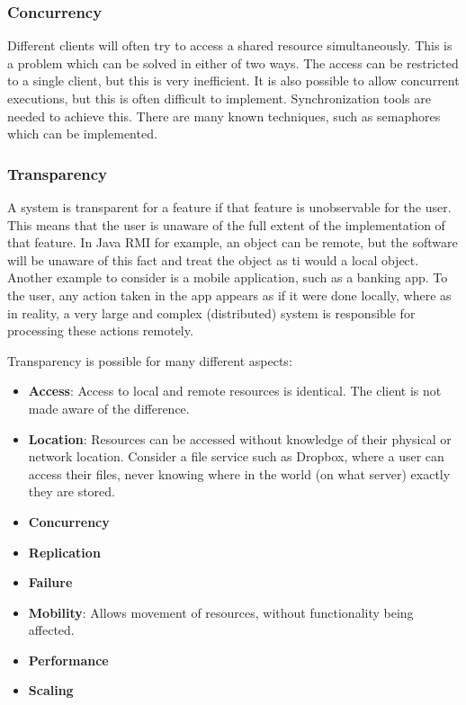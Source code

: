 \documentclass[a4paper]{article}
\begin{document}
\subsubsection{Concurrency}

Different clients will often try to access a shared resource simultaneously. This is a problem which can be solved in either of two ways. The access can be restricted to a single client, but this is very inefficient. It is also possible to allow concurrent executions, but this is often difficult to implement. Synchronization tools are needed to achieve this. There are many known techniques, such as semaphores which can be implemented.

\subsubsection{Transparency}

A system is transparent for a feature if that feature is unobservable for the user. This means that the user is unaware of the full extent of the implementation of that feature. In Java RMI for example, an object can be remote, but the software will be unaware of this fact and treat the object as ti would a local object. Another example to consider is a mobile application, such as a banking app. To the user, any action taken in the app appears as if it were done locally, where as in reality, a very large and complex (distributed) system is responsible for processing these actions remotely.

Transparency is possible for many different aspects:
\begin{itemize}
\item \textbf{Access}: Access to local and remote resources is identical. The client is not made aware of the difference.
\item \textbf{Location}: Resources can be accessed without knowledge of their physical or network location. Consider a file service such as Dropbox, where a user can access their files, never knowing where in the world (on what server) exactly they are stored.
\item \textbf{Concurrency}
\item \textbf{Replication}
\item \textbf{Failure}
\item \textbf{Mobility}: Allows movement of resources, without functionality being affected.
\item \textbf{Performance}
\item \textbf{Scaling}
\end{itemize}
\end{document}
